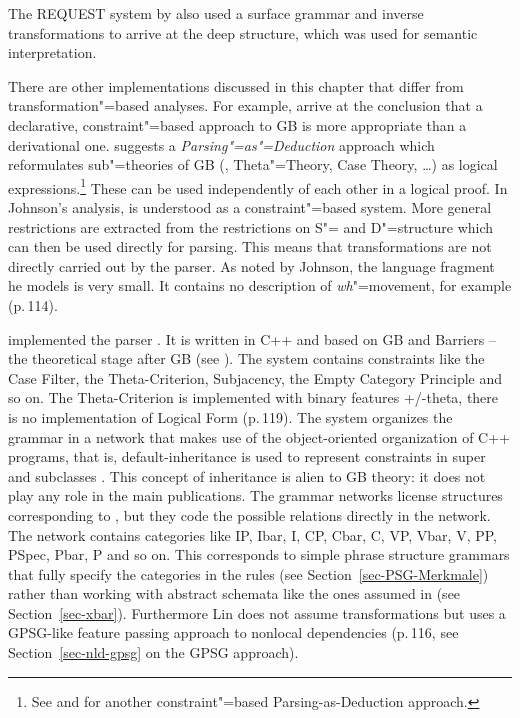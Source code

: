 The REQUEST system by \citet{Plath73a} also used a surface grammar and inverse transformations to
arrive at the deep structure, which was used for semantic interpretation.

There are other implementations discussed in this chapter that differ from transformation"=based analyses. For example, \citet[, Section~4]{KT91a}
arrive at the conclusion that a declarative, constraint"=based approach to GB is more appropriate than a derivational one. \citet{Johnson89a}
suggests a \emph{Parsing"=as"=Deduction} approach which reformulates sub"=theories of GB (\xbart,
Theta"=Theory, Case Theory, \ldots) as logical expressions.\footnote{%
	See  and  for another constraint"=based Parsing-as-Deduction approach.
}
These can be used independently of each other in a logical proof. In Johnson's analysis, \gbt is understood as a constraint"=based system. 
More general restrictions are extracted from the restrictions on S"= and D"=structure which can then be used directly for parsing. This means that 
transformations are not directly carried out by the parser. As noted by Johnson, the language fragment he models is very small. It contains no
description of \emph{wh}"=movement, for example (p.\,114). 

\citet{Lin93a} implemented the parser . It is written in C++ and based on GB and Barriers -- the theoretical
stage after GB (see \citealp{Chomsky86b}). The system contains constraints like
the Case Filter, the Theta-Criterion, Subjacency, the Empty Category Principle and so on. The
Theta-Criterion is implemented with binary features +/-theta, there is no implementation of Logical
Form (p.\,119). The system organizes the grammar in a network that makes use of the object-oriented
organization of C++ programs, that is, default-inheritance is used to represent constraints in super
and subclasses \citep[Section~5]{Lin93a}. This concept of inheritance is alien to GB theory: it does not play any role in the
main publications. The grammar networks license structures corresponding to \xbart, but they code
the possible relations directly in the network. The network contains categories like IP, Ibar, I,
CP, Cbar, C, VP, Vbar, V, PP, PSpec, Pbar, P and so on. This corresponds to simple phrase structure
grammars that fully specify the categories in the rules (see Section~\ref{sec-PSG-Merkmale}) rather than working with abstract schemata
like the ones assumed in \xbart (see Section~\ref{sec-xbar}). Furthermore Lin does not assume transformations but uses a
GPSG-like feature passing approach to nonlocal dependencies (p.\,116, see Section~\ref{sec-nld-gpsg} on the GPSG approach).

